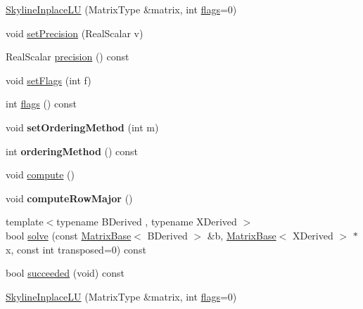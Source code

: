 \begin{DoxyCompactItemize}
\item 
\hyperlink{class_eigen_1_1_skyline_inplace_l_u_ac76b9384281e73b86b80f770015cf436}{Skyline\+Inplace\+LU} (Matrix\+Type \&matrix, int \hyperlink{class_eigen_1_1_skyline_inplace_l_u_a5e491f7643c548ac81d3f4a7e432be19}{flags}=0)
\item 
void \hyperlink{class_eigen_1_1_skyline_inplace_l_u_a1c057a7dec39b8b196d49d7d411ea999}{set\+Precision} (Real\+Scalar v)
\item 
Real\+Scalar \hyperlink{class_eigen_1_1_skyline_inplace_l_u_a050bcbe008f2ddeea4f6d5872e0daca5}{precision} () const
\item 
void \hyperlink{class_eigen_1_1_skyline_inplace_l_u_afd8013d183aaca495dfd10d819e61aaf}{set\+Flags} (int f)
\item 
int \hyperlink{class_eigen_1_1_skyline_inplace_l_u_a5e491f7643c548ac81d3f4a7e432be19}{flags} () const
\item 
\mbox{\label{class_eigen_1_1_skyline_inplace_l_u_a6709f4ee810842009a66b47f20dbbfd0}} 
void {\bfseries set\+Ordering\+Method} (int m)
\item 
\mbox{\label{class_eigen_1_1_skyline_inplace_l_u_ad7721922f4187358740de21788a4495d}} 
int {\bfseries ordering\+Method} () const
\item 
void \hyperlink{class_eigen_1_1_skyline_inplace_l_u_a590e9a988b2843712a29a541787e6c38}{compute} ()
\item 
\mbox{\label{class_eigen_1_1_skyline_inplace_l_u_a218636f299e9c066a07cb4be660267d1}} 
void {\bfseries compute\+Row\+Major} ()
\item 
{\footnotesize template$<$typename B\+Derived , typename X\+Derived $>$ }\\bool \hyperlink{class_eigen_1_1_skyline_inplace_l_u_a53c846d76559221d2bcf336a2da4d68f}{solve} (const \hyperlink{group___core___module_class_eigen_1_1_matrix_base}{Matrix\+Base}$<$ B\+Derived $>$ \&b, \hyperlink{group___core___module_class_eigen_1_1_matrix_base}{Matrix\+Base}$<$ X\+Derived $>$ $\ast$x, const int transposed=0) const
\item 
bool \hyperlink{class_eigen_1_1_skyline_inplace_l_u_abd633c27a0a342fb392b6af3ceb800ba}{succeeded} (void) const
\item 
\hyperlink{class_eigen_1_1_skyline_inplace_l_u_ac76b9384281e73b86b80f770015cf436}{Skyline\+Inplace\+LU} (Matrix\+Type \&matrix, int \hyperlink{class_eigen_1_1_skyline_inplace_l_u_a5e491f7643c548ac81d3f4a7e432be19}{flags}=0)

\end{DoxyCompactItemize}
